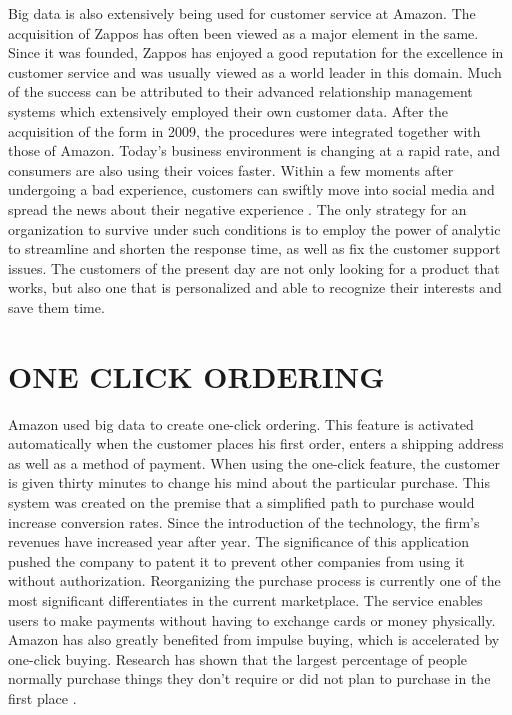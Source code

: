\documentclass[sigconf]{acmart}
\begin{document}
Big data is also extensively being used for customer service at Amazon. The acquisition of Zappos has often been viewed as a major element in the same. Since it was founded, Zappos has enjoyed a good reputation for the excellence in customer service and was usually viewed as a world leader in this domain. Much of the success can be attributed to their advanced relationship management systems which extensively employed their own customer data. After the acquisition of the form in 2009, the procedures were integrated together with those of Amazon.  Today’s business environment is changing at a rapid rate, and consumers are also using their voices faster. Within a few moments after undergoing a bad experience, customers can swiftly move into social media and spread the news about their negative experience \cite{Bryant2008}. The only strategy for an organization to survive under such conditions is to employ the power of analytic to streamline and shorten the response time, as well as fix the customer support issues.  The customers of the present day are not only looking for a product that works, but also one that is personalized and able to recognize their interests and save them time.

\section{ONE CLICK ORDERING}
Amazon used big data to create one-click ordering. This feature is activated automatically when the customer places his first order, enters a shipping address as well as a method of payment. When using the one-click feature, the customer is given thirty minutes to change his mind about the particular purchase. This system was created on the premise that a simplified path to purchase would increase conversion rates. Since the introduction of the technology, the firm’s revenues have increased year after year. The significance of this application pushed the company to patent it to prevent other companies from using it without authorization. Reorganizing the purchase process is currently one of the most significant differentiates in the current marketplace.  The service enables users to make payments without having to exchange cards or money physically. Amazon has also greatly benefited from impulse buying, which is accelerated by one-click buying. Research has shown that the largest percentage of people normally purchase things they don’t require or did not plan to purchase in the first place \cite{Roy2002}.
\end{document}
